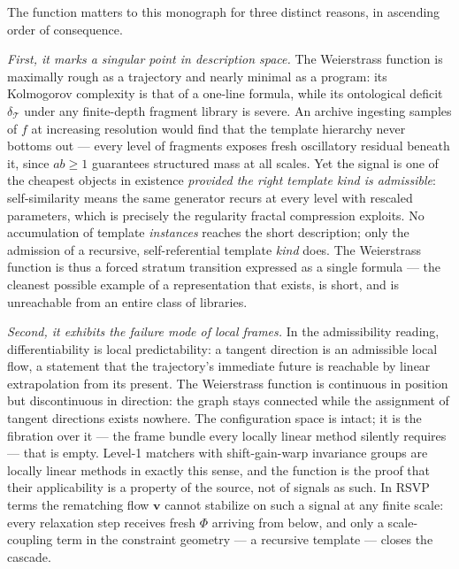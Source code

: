 \documentclass[11pt,oneside]{book}
\theoremstyle{remark}
\newcommand{\Tem}{\mathcal{T}}
\newcommand{\Phiv}{\Phi}
\newcommand{\vv}{\mathbf{v}}
\begin{document}
The function matters to this monograph for three distinct reasons, in
ascending order of consequence.

\emph{First, it marks a singular point in description space.} The
Weierstrass function is maximally rough as a trajectory and nearly
minimal as a program: its Kolmogorov complexity is that of a one-line
formula, while its ontological deficit $\delta_{\Tem}$ under any
finite-depth fragment library is severe. An archive ingesting samples
of $f$ at increasing resolution would find that the template hierarchy
never bottoms out --- every level of fragments exposes fresh
oscillatory residual beneath it, since $ab \ge 1$ guarantees structured
mass at all scales. Yet the signal is one of the cheapest objects in
existence \emph{provided the right template kind is admissible}:
self-similarity means the same generator recurs at every level with
rescaled parameters, which is precisely the regularity fractal
compression exploits. No accumulation of template \emph{instances}
reaches the short description; only the admission of a recursive,
self-referential template \emph{kind} does. The Weierstrass function is
thus a forced stratum transition expressed as a single formula --- the
cleanest possible example of a representation that exists, is short,
and is unreachable from an entire class of libraries.

\emph{Second, it exhibits the failure mode of local frames.} In the
admissibility reading, differentiability is local predictability: a
tangent direction is an admissible local flow, a statement that the
trajectory's immediate future is reachable by linear extrapolation from
its present. The Weierstrass function is continuous in position but
discontinuous in direction: the graph stays connected while the
assignment of tangent directions exists nowhere. The configuration
space is intact; it is the fibration over it --- the frame bundle every
locally linear method silently requires --- that is empty. Level-1
matchers with shift-gain-warp invariance groups are locally linear
methods in exactly this sense, and the function is the proof that their
applicability is a property of the source, not of signals as such. In
RSVP terms the rematching flow $\vv$ cannot stabilize on such a signal
at any finite scale: every relaxation step receives fresh $\Phiv$
arriving from below, and only a scale-coupling term in the constraint
geometry --- a recursive template --- closes the cascade.
\end{document}
